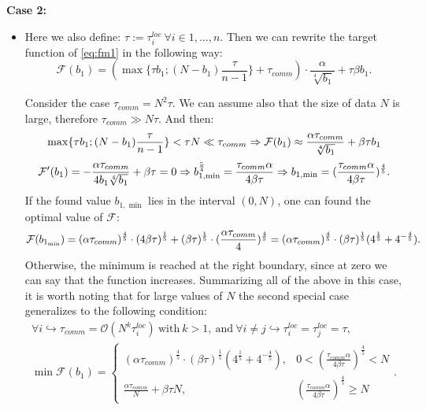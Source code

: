 \documentclass{article}
\theoremstyle{definition}
\theoremstyle{plain}
\begin{document}
\textbf{Case 2:}
\begin{itemize}
\item []
Here we also define: $\tau := \tau_i^{loc}~ \forall i \in {1,\ldots, n} $. Then we can rewrite the target function of \eqref{eq:fm1} in the following way:
\begin{equation*}
        \mathcal{F}(b_1) = (\max\{\tau b_1; (N-b_1) \frac{\tau}{n-1}\} + \tau_{comm}) \cdot \frac{\alpha}{\sqrt[4]{b_1}}+\tau \beta b_1. 
\end{equation*}

Consider the case $\tau_{comm} = N^2 \tau$. We can assume also that the size of data $N$ is large, therefore $\tau_{comm} \gg N\tau$. And then:
\begin{equation}
    \notag
     \max \{\tau b_1; (N-b_1)\frac{\tau}{n-1}\} < \tau N \ll \tau_{comm}\Rightarrow \mathcal{F}(b_1) \approx \frac{\alpha \tau_{comm}}{\sqrt[4]{b_1}} + \beta \tau b_1 
\end{equation}
\begin{equation}
    \notag
    \mathcal{F}' (b_1) = -\frac{\alpha \tau_{comm}}{4b_1\sqrt[4]{b_1}} + \beta \tau = 0 \Rightarrow b_{1, {\min}}^\frac{5}{4} = \frac{\tau _{comm}\alpha}{4\beta\tau}\Rightarrow b_{1, {\min}} = (\frac{\tau _{comm}\alpha}{4\beta\tau})^{\frac{4}{5}}.
\end{equation}
If the found value $b_{1, {\min}}$ lies in the interval $(0, N) $, one can found the optimal value of $\mathcal{F}$:
\begin{equation}
    \notag
    \mathcal{F}(b_{1_{\min}}) = (\alpha \tau_{comm})^\frac{4}{5} \cdot (4\beta\tau)^\frac{1}{5} + (\beta \tau)^\frac{1}{5}\cdot(\frac{\alpha \tau_{comm}}{4})^\frac{4}{5} = (\alpha \tau_{comm})^\frac{4}{5}\cdot (\beta\tau)^\frac{1}{5}(4^\frac{1}{5} + 4^{-\frac{4}{5}}).
\end{equation}
Otherwise, the minimum is reached at the right boundary, since at zero we can say that the function increases. Summarizing all of the above in this case, it is worth noting that for large values of $N$ the second special case generalizes to the following condition:
\begin{equation}
    \label{eq:temp404}
    \begin{split}
    \forall i  \hookrightarrow \tau_{comm} = \mathcal{O}( N^k \tau_i^{loc}) ~\text{with}~ k >1 , ~\text{and}~ \forall i\neq j\hookrightarrow \tau_i^{loc} = \tau_j^{loc} = \tau,
    \\
    \min {\mathcal{F}}(b_1) = \begin{cases}
      (\alpha \tau_{comm})^\frac{4}{5}\cdot (\beta\tau)^\frac{1}{5}(4^\frac{1}{5} + 4^{-\frac{4}{5}}), & 0 < (\frac{\tau _{comm}\alpha}{4\beta\tau})^{\frac{4}{5}} < N\\
      \frac{\alpha\tau _{comm}}{N} + \beta \tau N , & (\frac{\tau _{comm}\alpha}{4\beta\tau})^{\frac{4}{5}} \geq N
    \end{cases}.
    \end{split}
\end{equation}
\end{itemize}
\end{document}
